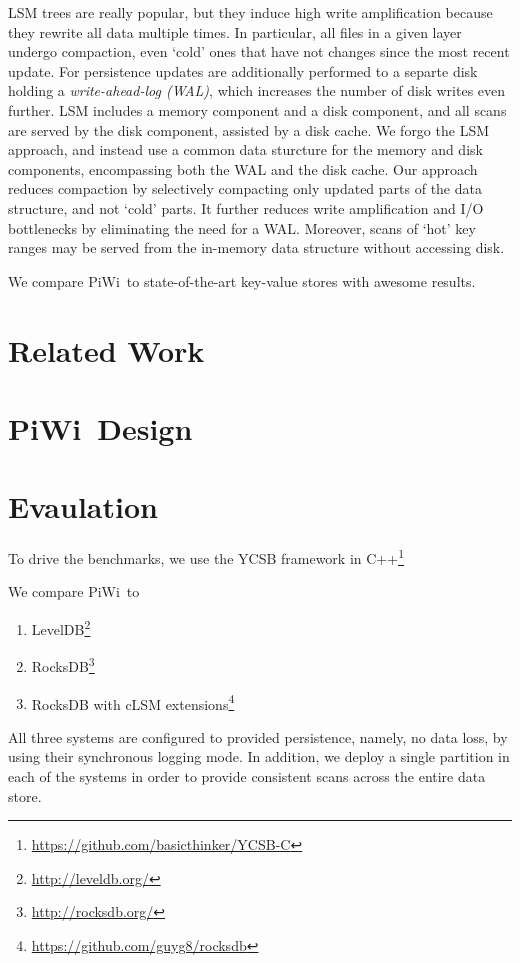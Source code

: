 \documentclass[10pt,preprint,numbers]{sigplanconf}
\newcommand{\sys}{PiWi}
\begin{document}
LSM trees are really popular, but they induce high write amplification because they rewrite all data multiple times. In particular,
all files in a given layer undergo compaction, even `cold' ones that have not changes since the most recent update.
For persistence updates are additionally performed to a separte disk holding a \emph{write-ahead-log (WAL)}, which increases
the number of disk writes even further. LSM includes a memory component and a disk component, and all scans are served
by the disk component, assisted by a disk cache. 
We forgo the  LSM approach, and instead use a common data sturcture for the memory and disk components, 
encompassing both the WAL and the disk cache. 
Our approach reduces compaction by selectively compacting only
updated parts of the data structure, and not `cold' parts.
It further reduces write amplification and I/O bottlenecks by eliminating the need for a WAL.
Moreover, scans of `hot' key ranges may be served from the in-memory data structure without accessing disk.

We compare \sys\ to state-of-the-art key-value stores with awesome results. 

\section{Related Work}
\label{sec:related}

\section{\sys\ Design}
\label{sec:design}


\section{Evaulation}
\label{sec:eval}

To drive the benchmarks, we use the 
YCSB framework in C++\footnote{\url{https://github.com/basicthinker/YCSB-C}}  

We compare \sys\ to 
\begin{enumerate}
\item
LevelDB\footnote{\url{http://leveldb.org/}}
\item
RocksDB\footnote{\url{http://rocksdb.org/}}
\item
RocksDB with cLSM extensions\footnote{\url{https://github.com/guyg8/rocksdb}}
\end{enumerate}
All three systems are configured to provided persistence, namely, no data loss, by using their synchronous logging mode.
In addition, we deploy a single partition in each of the systems in order to provide consistent scans across the entire data store.
\end{document}
